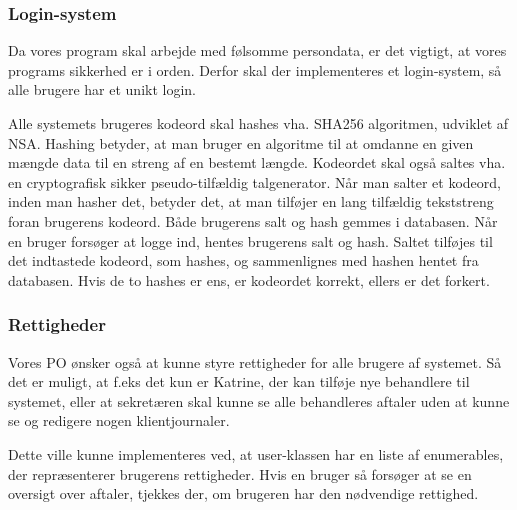\subsubsection{Login-system}
\label{login}
Da vores program skal arbejde med følsomme persondata, er det vigtigt, at vores programs sikkerhed er i orden.
Derfor skal der implementeres et login-system, så alle brugere har et unikt login.

Alle systemets brugeres kodeord skal hashes vha. SHA256 algoritmen, udviklet af NSA.
Hashing betyder, at man bruger en algoritme til at omdanne en given mængde data til en streng af en bestemt længde.
Kodeordet skal også saltes vha. en cryptografisk sikker pseudo-tilfældig talgenerator.
Når man salter et kodeord, inden man hasher det, betyder det, at man tilføjer en lang tilfældig tekststreng foran brugerens kodeord.
Både brugerens salt og hash gemmes i databasen.
Når en bruger forsøger at logge ind, hentes brugerens salt og hash.
Saltet tilføjes til det indtastede kodeord, som hashes, og sammenlignes med hashen hentet fra databasen.
Hvis de to hashes er ens, er kodeordet korrekt, ellers er det forkert.\cite{hash}

\subsubsection{Rettigheder}
Vores PO ønsker også at kunne styre rettigheder for alle brugere af systemet.
Så det er muligt, at f.eks det kun er Katrine, der kan tilføje nye behandlere til systemet, eller at sekretæren skal kunne se alle behandleres aftaler uden at kunne se og redigere nogen klientjournaler.

Dette ville kunne implementeres ved, at user-klassen har en liste af enumerables, der repræsenterer brugerens rettigheder.
Hvis en bruger så forsøger at se en oversigt over aftaler, tjekkes der, om brugeren har den nødvendige rettighed.